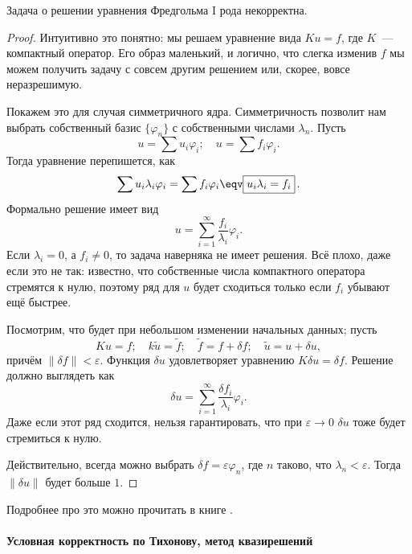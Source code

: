 \documentclass{trlnotes}
\begin{document}
    \begin{st}
        Задача о решении уравнения Фредгольма I рода некорректна.
        \begin{proof}
            Интуитивно это понятно: мы решаем уравнение вида $Ku = f$, где $K$~--- компактный оператор. Его образ маленький, и логично, что слегка изменив $f$ мы можем получить задачу с совсем другим решением или, скорее, вовсе неразрешимую. 

            Покажем это для случая симметричного ядра. Симметричность позволит нам выбрать собственный базис $\{\varphi_n\}$ с собственными числами $\lambda_n$. Пусть
            \[
                u = \sum u_i \varphi_i; \quad u = \sum f_i \varphi_i.
            \]
            Тогда уравнение перепишется, как
            \[
                \sum u_i \lambda_i \varphi_i = \sum f_i \varphi_i \eqv \boxed{u_i \lambda_i = f_i}\,.
            \]
            Формально решение имеет вид
            \[
                u = \sum\limits_{i = 1}^{\infty} \dfrac{f_i}{\lambda_i}\varphi_i.
            \]
            Если $\lambda_i = 0$, а $f_i \neq 0$, то задача наверняка не имеет решения. Всё плохо, даже если это не так: известно, что собственные числа компактного оператора стремятся к нулю, поэтому ряд для $u$ будет сходиться только если $f_i$ убывают ещё быстрее.

            Посмотрим, что будет при небольшом изменении начальных данных; пусть
            \[
                Ku = f; \quad k\tilde{u} = \tilde f; \quad \tilde{f} = f + \delta f; \quad \tilde{u} = u + \delta u,
            \]
            причём $\|\delta f\| < \varepsilon$. Функция $\delta u$ удовлетворяет уравнению $K\delta u = \delta f$. Решение должно выглядеть как
            \[
                \delta u = \sum\limits_{i = 1}^{\infty} \dfrac{\delta f_i}{\lambda_i}\varphi_i.
            \]
            Даже если этот ряд сходится, нельзя гарантировать, что при $\varepsilon \to 0$ $\delta u$ тоже будет стремиться к нулю. 

            Действительно, всегда можно выбрать $\delta f = \varepsilon \varphi_n$, где $n$ таково, что $\lambda_n < \varepsilon$. Тогда $\|\delta u\|$ будет больше $1$.
        \end{proof}

        Подробнее про это можно прочитать в книге \cite{bahvalov}.
    \end{st}

    \paragraph{Условная корректность по Тихонову, метод квазирешений}
\end{document}
